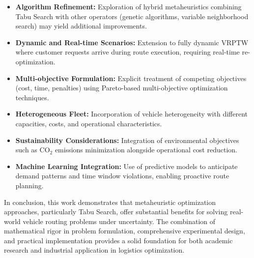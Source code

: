 \begin{itemize}
    \item \textbf{Algorithm Refinement:} Exploration of hybrid metaheuristics combining Tabu Search with other operators (genetic algorithms, variable neighborhood search) may yield additional improvements.
    
    \item \textbf{Dynamic and Real-time Scenarios:} Extension to fully dynamic VRPTW where customer requests arrive during route execution, requiring real-time re-optimization.
    
    \item \textbf{Multi-objective Formulation:} Explicit treatment of competing objectives (cost, time, penalties) using Pareto-based multi-objective optimization techniques.
    
    \item \textbf{Heterogeneous Fleet:} Incorporation of vehicle heterogeneity with different capacities, costs, and operational characteristics.
    
    \item \textbf{Sustainability Considerations:} Integration of environmental objectives such as CO$_2$ emissions minimization alongside operational cost reduction.
    
    \item \textbf{Machine Learning Integration:} Use of predictive models to anticipate demand patterns and time window violations, enabling proactive route planning.
\end{itemize}

In conclusion, this work demonstrates that metaheuristic optimization approaches, particularly Tabu Search, offer substantial benefits for solving real-world vehicle routing problems under uncertainty. The combination of mathematical rigor in problem formulation, comprehensive experimental design, and practical implementation provides a solid foundation for both academic research and industrial application in logistics optimization.